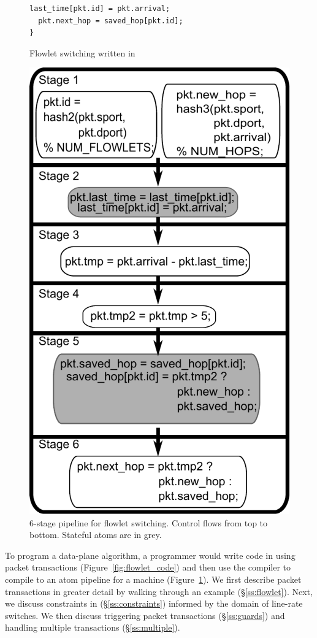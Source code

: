 \begin{figure}[!t]
\begin{minipage}{0.5\textwidth}
\begin{small}
\begin{lstlisting}[style=customc]
  last_time[pkt.id] = pkt.arrival;
  pkt.next_hop = saved_hop[pkt.id];
}
\end{lstlisting}
\end{small}
\caption{Flowlet switching written in \pktlanguage}
\label{fig:flowlet_code}
\end{minipage}
%
\vrule\quad
%
\begin{minipage}{0.4\textwidth}
\includegraphics[width=0.8\columnwidth]{pipe.pdf}
\caption{6-stage \absmachine pipeline for flowlet
switching.  Control flows from top to bottom. Stateful atoms are in grey.}
\label{fig:flowlet_pipeline}
\end{minipage}
\end{figure}

To program a data-plane algorithm, a programmer would write code in
\pktlanguage using packet transactions (Figure~\ref{fig:flowlet_code}) and then
use the \pktlanguage compiler to compile to an atom pipeline for a \absmachine
machine (Figure~\ref{fig:flowlet_pipeline}). We first describe packet
transactions in greater detail by walking through an example
(\S\ref{ss:flowlet}). Next, we discuss constraints in \pktlanguage
(\S\ref{ss:constraints}) informed by the domain of line-rate switches. We then
discuss triggering packet transactions (\S\ref{ss:guards}) and handling
multiple transactions (\S\ref{ss:multiple}).

